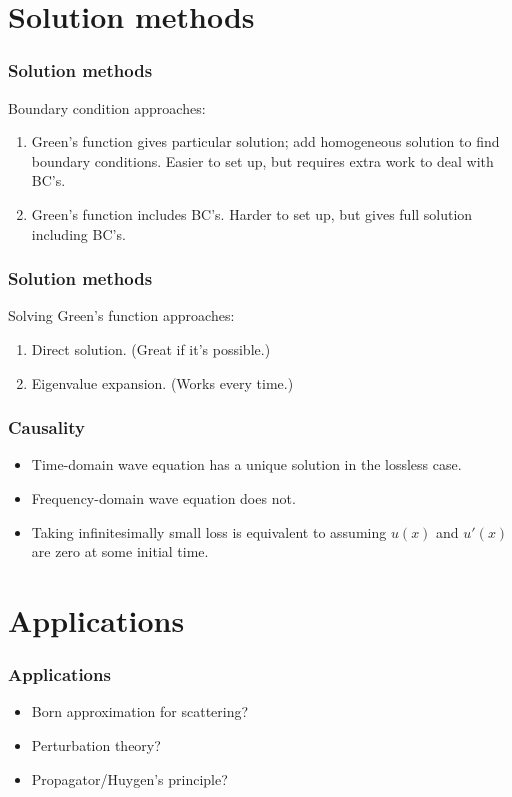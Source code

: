 \documentclass[12 pt, compress, handout, intlimits]{beamer}
\begin{document}
\note{}

\section{Solution methods}
\label{sec:solution_methods}

\note{}

\begin{frame}[fragile]
    \frametitle{Solution methods}
    Boundary condition approaches:
    \begin{enumerate}
    \item
        Green's function gives particular solution; add homogeneous solution to find boundary conditions.
        Easier to set up, but requires extra work to deal with BC's.
    \item
        Green's function includes BC's.
        Harder to set up, but gives full solution including BC's.
    \end{enumerate}
\end{frame}

\note{}

\begin{frame}[fragile]
    \frametitle{Solution methods}
     Solving Green's function approaches:
    \begin{enumerate}
    \item
        Direct solution. (Great if it's possible.)
    \item
        Eigenvalue expansion. (Works every time.)
    \end{enumerate}
\end{frame}

\note{}

\begin{frame}[fragile]
    \frametitle{Causality}
    \begin{itemize}
    \item
        Time-domain wave equation has a unique solution in the lossless case.
    \item
        Frequency-domain wave equation does not.
    \item
        Taking infinitesimally small loss is equivalent to assuming $ u(x) $ and $ u'(x) $ are zero at some initial time.
    \end{itemize}
\end{frame}

\note{}

\section{Applications}
\label{sec:applications}

\note{}

\begin{frame}[fragile]
    \frametitle{Applications}
    \begin{itemize}
    \item
        Born approximation for scattering?
    \item
        Perturbation theory?
    \item
        Propagator/Huygen's principle?
    \end{itemize}
\end{frame}

\note{}
\end{document}
